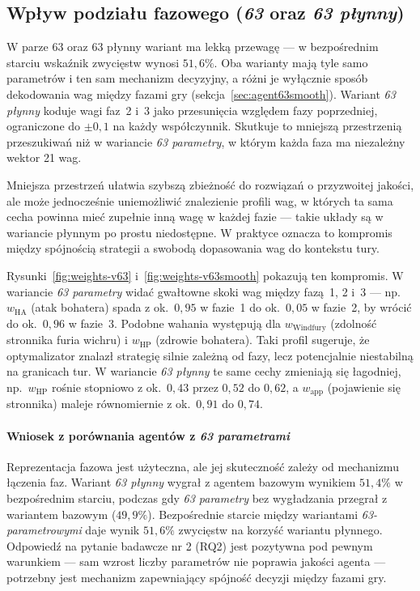 \subsection{Wpływ podziału fazowego (\textit{63} oraz \textit{63 płynny})}

W parze \textit{\(63\)} oraz \textit{\(63\)} płynny wariant ma lekką przewagę --- w bezpośrednim starciu wskaźnik zwycięstw wynosi \(51{,}6\%\). Oba warianty mają tyle samo parametrów i ten sam mechanizm decyzyjny, a różni je wyłącznie sposób dekodowania wag między fazami gry (sekcja~\ref{sec:agent63smooth}). Wariant \textit{63 płynny} koduje wagi faz~2 i~3 jako przesunięcia względem fazy poprzedniej, ograniczone do \(\pm 0{,}1\) na każdy współczynnik. Skutkuje to mniejszą przestrzenią przeszukiwań niż w wariancie \textit{63 parametry}, w którym każda faza ma niezależny wektor 21 wag.

Mniejsza przestrzeń ułatwia szybszą zbieżność do rozwiązań o przyzwoitej jakości, ale może jednocześnie uniemożliwić znalezienie profili wag, w których ta sama cecha powinna mieć zupełnie inną wagę w każdej fazie --- takie układy są w wariancie płynnym po prostu niedostępne. W praktyce oznacza to kompromis między spójnością strategii a swobodą dopasowania wag do kontekstu tury.



Rysunki~\ref{fig:weights-v63} i~\ref{fig:weights-v63smooth} pokazują ten kompromis. W wariancie \textit{63 parametry} widać gwałtowne skoki wag między fazą~1, 2 i~3 --- np.\ \(w_{\text{HA}}\) (atak bohatera) spada z ok.\ \(0{,}95\) w fazie~1 do ok.\ \(0{,}05\) w fazie~2, by wrócić do ok.\ \(0{,}96\) w fazie~3. Podobne wahania występują dla \(w_{\text{Windfury}}\) (zdolność stronnika furia wichru) i \(w_{\text{HP}}\) (zdrowie bohatera). Taki profil sugeruje, że optymalizator znalazł strategię silnie zależną od fazy, lecz potencjalnie niestabilną na granicach tur. W wariancie \textit{63 płynny} te same cechy zmieniają się łagodniej, np.\ \(w_{\text{HP}}\) rośnie stopniowo z ok.\ \(0{,}43\) przez \(0{,}52\) do \(0{,}62\), a \(w_{\text{app}}\) (pojawienie się stronnika) maleje równomiernie z ok.\ \(0{,}91\) do \(0{,}74\).

\paragraph{Wniosek z porównania agentów z \textit{63 parametrami}}
Reprezentacja fazowa jest użyteczna, ale jej skuteczność zależy od mechanizmu łączenia faz. Wariant \textit{63 płynny} wygrał z agentem bazowym wynikiem \(51{,}4\%\) w bezpośrednim starciu, podczas gdy \textit{63 parametry} bez wygładzania przegrał z wariantem bazowym (\(49{,}9\%\)). Bezpośrednie starcie między wariantami \textit{63-parametrowymi} daje wynik \(51{,}6\%\) zwycięstw na korzyść wariantu płynnego. Odpowiedź na pytanie badawcze nr 2 (RQ2) jest pozytywna pod pewnym warunkiem --- sam wzrost liczby parametrów nie poprawia jakości agenta --- potrzebny jest mechanizm zapewniający spójność decyzji między fazami gry.

